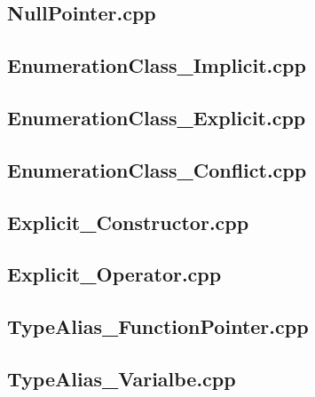 \documentclass[11pt]{report}
\begin{document}
\begin{appendix}
\subsection{NullPointer.cpp}
\label{NullPointer}


\subsection{EnumerationClass\_Implicit.cpp}
\label{EnumerationClass_Implicit}


\subsection{EnumerationClass\_Explicit.cpp}
\label{EnumerationClass_Explicit}


\subsection{EnumerationClass\_Conflict.cpp}
\label{EnumerationClass_Conflict}


\subsection{Explicit\_Constructor.cpp}
\label{Explicit_Constructor}


\subsection{Explicit\_Operator.cpp}
\label{Explicit_Operator}


\subsection{TypeAlias\_FunctionPointer.cpp}
\label{TypeAlias_FunctionPointer}


\subsection{TypeAlias\_Varialbe.cpp}
\label{TypeAlias_Varialbe}



\end{appendix}
\end{document}
